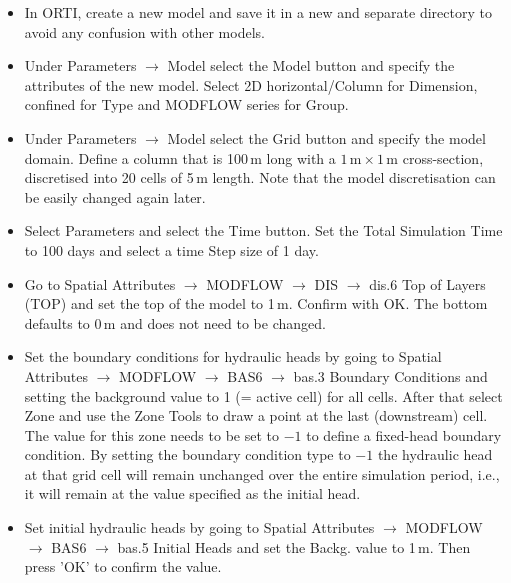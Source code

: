 \begin{itemize}

\item In ORTI, create a new model and save it in a new and separate
directory to avoid any confusion with other models.

\item Under {\color{blue}Parameters} $\rightarrow$ {\color{blue}Model}
select the {\color{blue}Model} button and specify the attributes of the
new model. Select {\color{blue}2D horizontal/Column} for {\color{blue}Dimension},
{\color{blue}confined} for {\color{blue}Type} and
{\color{blue}MODFLOW series} for {\color{blue}Group}.

\item Under {\color{blue}Parameters} $\rightarrow$ {\color{blue}Model}
select the {\color{blue}Grid} button and specify the model domain.
Define a column that is 100\,m long with a $1\,\mathrm{m} \times
1\,\mathrm{m}$ cross-section, discretised into 20 cells of 5\,m length.
Note that the model discretisation can be easily changed again later.

\item Select {\color{blue}Parameters} and select the
{\color{blue}Time} button.
Set the {\color{blue}Total Simulation Time} to 100 days and select a
time {\color{blue}Step size} of 1 day.

\item Go to {\color{blue}Spatial Attributes} $\rightarrow$
{\color{blue}MODFLOW} $\rightarrow$ {\color{blue}DIS} $\rightarrow$
{\color{blue}dis.6 Top of Layers (TOP)} and set the top of the model
to 1\,m.
Confirm with {\color{blue}OK}.
The bottom defaults to 0\,m and does not need to be changed.

\item Set the boundary conditions for hydraulic heads by going to
{\color{blue}Spatial Attributes} $\rightarrow$
{\color{blue}MODFLOW} $\rightarrow$
{\color{blue}BAS6} $\rightarrow$
{\color{blue}bas.3 Boundary Conditions}
and setting the background value to 1 (= active cell) for all cells.
After that select {\color{blue}Zone} and use the {\color{blue}Zone Tools}
to draw a point at the last (downstream) cell.
The value for this zone needs to be set to $-1$ to define a fixed-head
boundary condition.
By setting the boundary condition type to $-1$ the hydraulic head at
that grid cell will remain unchanged over the entire simulation period,
i.e., it will remain at the value specified as the initial head.

\item Set initial hydraulic heads by going to
{\color{blue}Spatial Attributes} $\rightarrow$
{\color{blue}MODFLOW} $\rightarrow$
{\color{blue}BAS6} $\rightarrow$
{\color{blue}bas.5 Initial Heads}
and set the {\color{blue}Backg.} value to 1\,m.
Then press {\color{blue}'OK'} to confirm the value.


\end{itemize}
